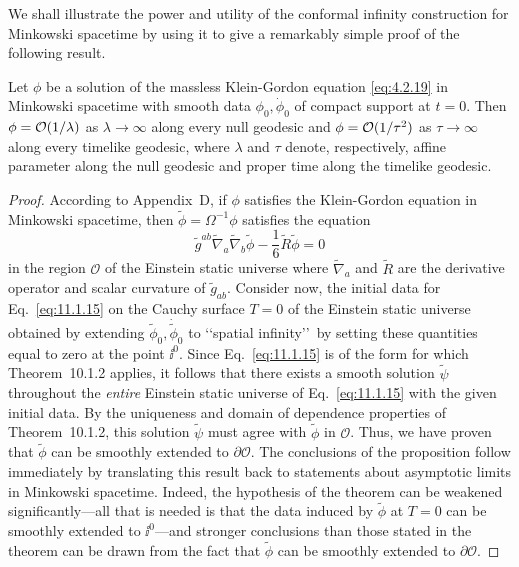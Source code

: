 We shall illustrate the power and utility of the conformal infinity construction for
Minkowski spacetime by using it to give a remarkably simple proof of the following
result.

\begin{proposition}\label{prop:11.1.1}
Let \(\phi\) be a solution of the massless Klein-Gordon equation
\eqref{eq:4.2.19} in Minkowski spacetime with smooth data
\(\phi_0,\dot\phi_0\) of compact support at \(t=0\). Then
\(\phi=\mathcal{O}(1/\lambda)\) as \(\lambda\to\infty\) along every null geodesic and
\(\phi=\mathcal{O}(1/\tau^2)\) as \(\tau\to\infty\) along every timelike geodesic, where
\(\lambda\) and \(\tau\) denote, respectively, affine parameter along the null
geodesic and proper time along the timelike geodesic.
\end{proposition}

\begin{proof}
According to Appendix~D, if \(\phi\) satisfies the Klein-Gordon equation in
Minkowski spacetime, then \(\tilde\phi=\Omega^{-1}\phi\) satisfies the equation
\begin{equation}
  \tilde g^{ab}\tilde\nabla_a\tilde\nabla_b\tilde\phi
  -\frac16\tilde R\tilde\phi=0
  \tag{11.1.15}\label{eq:11.1.15}
\end{equation}
in the region \(\mathcal O\) of the Einstein static universe where
\(\tilde\nabla_a\) and \(\tilde R\) are the derivative operator and scalar curvature
of \(\tilde g_{ab}\). Consider now, the initial data for Eq.~\eqref{eq:11.1.15} on
the Cauchy surface \(T=0\) of the Einstein static universe obtained by extending
\(\tilde\phi_0,\dot{\tilde\phi}_0\) to \lq\lq spatial infinity\rq\rq\ by setting these
quantities equal to zero at the point \(\ii^0\). Since Eq.~\eqref{eq:11.1.15} is of the
form for which Theorem~10.1.2 applies, it follows that there exists a smooth
solution \(\tilde\psi\) throughout the \emph{entire} Einstein static universe of
Eq.~\eqref{eq:11.1.15} with the given initial data. By the uniqueness and domain of
dependence properties of Theorem~10.1.2, this solution \(\tilde\psi\) must agree with
\(\tilde\phi\) in \(\mathcal O\). Thus, we have proven that \(\tilde\phi\) can be smoothly
extended to \(\partial\mathcal O\). The conclusions of the proposition follow
immediately by translating this result back to statements about asymptotic limits in
Minkowski spacetime. Indeed, the hypothesis of the theorem can be weakened
significantly---all that is needed is that the data induced by \(\tilde\phi\) at \(T=0\)
can be smoothly extended to \(\ii^0\)---and stronger conclusions than those stated in
the theorem can be drawn from the fact that \(\tilde\phi\) can be smoothly extended
to \(\partial\mathcal O\).
\end{proof}

